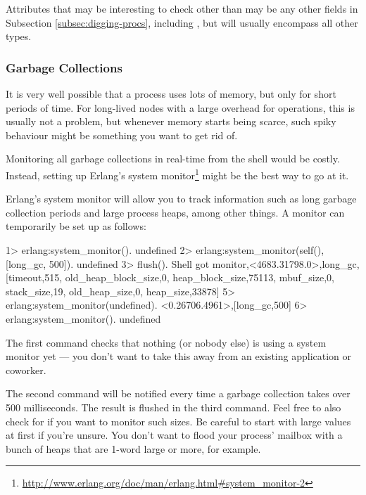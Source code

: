 \documentclass[11pt, oneside]{book}   	%
\begin{document}
Attributes that may be interesting to check other than  may be any other fields in Subsection \ref{subsec:digging-procs}, including , but  will usually encompass all other types.

\subsubsection{Garbage Collections}
\label{subsubsec:leak-gc}

It is very well possible that a process uses lots of memory, but only for short periods of time. For long-lived nodes with a large overhead for operations, this is usually not a problem, but whenever memory starts being scarce, such spiky behaviour might be something you want to get rid of.

Monitoring all garbage collections in real-time from the shell would be costly. Instead, setting up Erlang's system monitor\footnote{\href{http://www.erlang.org/doc/man/erlang.html\#system\_monitor-2}{http://www.erlang.org/doc/man/erlang.html\#system\_monitor-2}} might be the best way to go at it.

Erlang's system monitor will allow you to track information such as long garbage collection periods and large process heaps, among other things. A monitor can temporarily be set up as follows:

\begin{VerbatimEshell}
1> erlang:system_monitor().
undefined
2> erlang:system_monitor(self(), [{long_gc, 500}]).
undefined
3> flush().
Shell got {monitor,<4683.31798.0>,long_gc,
                   [{timeout,515},
                    {old_heap_block_size,0},
                    {heap_block_size,75113},
                    {mbuf_size,0},
                    {stack_size,19},
                    {old_heap_size,0},
                    {heap_size,33878}]}
5> erlang:system_monitor(undefined).
{<0.26706.4961>,[{long_gc,500}]}
6> erlang:system_monitor().
undefined
\end{VerbatimEshell}

The first command checks that nothing (or nobody else) is using a system monitor yet — you don't want to take this away from an existing application or coworker.

The second command will be notified every time a garbage collection takes over 500 milliseconds. The result is flushed in the third command. Feel free to also check for  if you want to monitor such sizes.
Be careful to start with large values at first if you're unsure. You don't want to flood your process' mailbox with a bunch of heaps that are 1-word large or more, for example.
\end{document}

